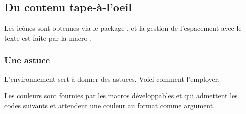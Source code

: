 \documentclass[10pt, a4paper]{article}
\begin{document}
\subsection{Du contenu tape-à-l'oeil}

\begin{tdocnote}
    Les icônes sont obtenues via le package , et la gestion de l'espacement avec le texte est faite par la macro .
\end{tdocnote}


\subsubsection{Une astuce}

L'environnement  sert à donner des astuces. Voici comment l'employer.



\smallskip

\begin{tdocnote}
    Les couleurs sont fournies par les macros développables  et  qui admettent les codes suivants et attendent une couleur au format  comme argument.

    \begin{tdoclatex}[code]
    \end{tdoclatex}
\end{tdocnote}
\end{document}
